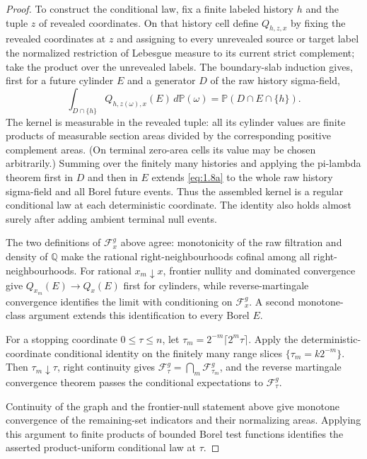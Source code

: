 \documentclass[11pt,reqno]{amsart}
\theoremstyle{definition}
\theoremstyle{remark}
\numberwithin{equation}{section}
\newcommand{\Pp}{\mathbb P}
\begin{document}
\begin{proof}
To construct the conditional law, fix a finite labeled history \(h\) and
the tuple \(z\) of revealed coordinates.  On that history cell define
\(Q_{h,z,x}\) by fixing
the revealed coordinates at \(z\) and assigning to every unrevealed source
or target label the normalized restriction of Lebesgue measure to its
current strict complement; take the product over the unrevealed labels.
The boundary-slab induction gives, first for a future cylinder \(E\) and a
generator \(D\) of the raw history sigma-field,
\begin{equation}
 \int_{D\cap\{h\}} Q_{h,z(\omega),x}(E)\,d\Pp(\omega)
 =\Pp(D\cap E\cap\{h\}).
\label{eq:1.8a}
\end{equation}
The kernel is measurable in the revealed tuple: all its cylinder values are
finite products of measurable section areas divided by the corresponding
positive complement areas.  (On terminal zero-area cells its value may be
chosen arbitrarily.)  Summing over the finitely many histories and applying
the pi-lambda theorem first in \(D\) and then in \(E\) extends \eqref{eq:1.8a} to the
whole raw history sigma-field and all Borel future events.  Thus the assembled
kernel is a regular conditional law at each deterministic coordinate.
The identity also holds almost surely after adding ambient terminal null events.

The two definitions of \(\mathcal F_x^g\) above agree: monotonicity of the raw
filtration and density of \(\mathbb Q\) make the rational right-neighbourhoods
cofinal among all right-neighbourhoods.  For rational \(x_m\downarrow x\),
frontier nullity and dominated convergence give
\(Q_{x_m}(E)\to Q_x(E)\) first for cylinders, while reverse-martingale
convergence identifies the limit with conditioning on \(\mathcal F_x^g\).
A second monotone-class argument extends this identification to every Borel
\(E\).

For a stopping coordinate \(0\le\tau\le n\), let
\(\tau_m=2^{-m}\lceil2^m\tau\rceil\).  Apply the deterministic-coordinate
conditional identity on the finitely many range slices
\(\{\tau_m=k2^{-m}\}\).  Then
\(\tau_m\downarrow\tau\), right continuity gives
\(\mathcal F_\tau^g=\bigcap_m\mathcal F_{\tau_m}^g\), and the reverse
martingale convergence theorem passes the conditional expectations to
\(\mathcal F_\tau^g\).

Continuity of the graph and the frontier-null
statement above give monotone convergence of the remaining-set indicators
and their normalizing areas.  Applying this argument to finite products of
bounded Borel test functions identifies the asserted product-uniform
conditional law at \(\tau\).
\end{proof}
\end{document}
